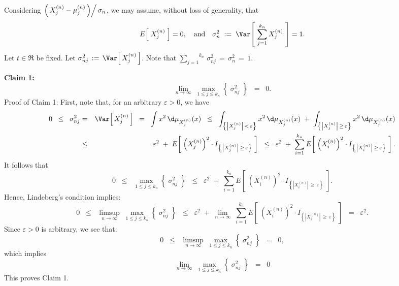 \proof
Considering $\left.\left(\,X^{(n)}_{j} - \mu^{(n)}_{j}\,\right) \right/ \sigma_{n}$, we may assume, without loss of generality, that
\begin{equation*}
E\!\left[\;X^{(n)}_{j}\;\right] = 0,
\quad\textnormal{and}\quad
\sigma^{2}_{n}\;:=\;\Var\!\left[\;\sum^{k_{n}}_{j=1}X^{(n)}_{j}\;\right] = 1.
\end{equation*}
Let $t \in \Re$ be fixed.
Let $\sigma^{2}_{nj} \,:=\, \Var\!\left[\,X^{(n)}_{j}\,\right]$.
Note that $\overset{k_{n}}{\underset{j=1}{\sum}}\,\sigma^{2}_{nj} \,=\, \sigma^{2}_{n} \,=\,1$.

\vskip 0.5cm
\noindent
\textbf{Claim 1:}
\begin{equation*}
\lim_{n\rightarrow\infty}\;\max_{1\leq j \leq k_{n}}\left\{\; \sigma^{2}_{nj} \;\right\}
\;\;=\;\; 0.
\end{equation*}
{\small Proof of Claim 1:
First, note that, for an arbitrary $\varepsilon > 0$, we have
\begin{eqnarray*}
0 \;\;\leq\;\;
\sigma^{2}_{nj}
&=& \Var\!\left[\,X^{(n)}_{j}\,\right]
\;\;=\;\; \int x^{2}\,\d\mu_{X^{(n)}_{j}}(x)
\;\;\leq\;\;  \int_{\left\{\left\vert X^{(n)}_{j}\right\vert\,<\,\varepsilon\right\}}x^{2}\,\d\mu_{X^{(n)}_{j}}(x)
\;+\;  \int_{\left\{\left\vert X^{(n)}_{j}\right\vert\,\geq\,\varepsilon\right\}}x^{2}\,\d\mu_{X^{(n)}_{j}}(x)
\\
&\leq& \varepsilon^{2}
\;+\; E\!\left[\;\left(X^{(n)}_{j}\right)^{2}\cdot I_{\left\{\left\vert X^{(n)}_{j}\right\vert\,\geq\,\varepsilon\right\}}\;\right]
\;\;\leq\;\; \varepsilon^{2}
\;+\; \sum_{i=1}^{k_{n}}E\!\left[\;\left(X^{(n)}_{i}\right)^{2}\cdot I_{\left\{\left\vert X^{(n)}_{i}\right\vert\,\geq\,\varepsilon\right\}}\;\right].
\end{eqnarray*}
It follows that
\begin{equation*}
0 \;\;\leq\;\;
\max_{1 \leq j \leq k_{n}}\left\{\;\sigma^{2}_{nj}\;\right\}
\;\;\leq\;\; \varepsilon^{2}
\;+\; \sum_{i=1}^{k_{n}}E\!\left[\;\left(X^{(n)}_{i}\right)^{2}\cdot I_{\left\{\left\vert X^{(n)}_{i}\right\vert\,\geq\,\varepsilon\right\}}\;\right].
\end{equation*}
Hence, Lindeberg's condition implies:
\begin{equation*}
0 \;\;\leq\;\;
\limsup_{n\rightarrow\infty}\;\max_{1 \leq j \leq k_{n}}\left\{\;\sigma^{2}_{nj}\;\right\}
\;\;\leq\;\; \varepsilon^{2}
\;+\; \lim_{n\rightarrow\infty}\;\sum_{i=1}^{k_{n}}E\!\left[\;\left(X^{(n)}_{i}\right)^{2}\cdot I_{\left\{\left\vert X^{(n)}_{i}\right\vert\,\geq\,\varepsilon\right\}}\;\right]
\;\;=\;\; \varepsilon^{2}.
\end{equation*}
Since $\varepsilon > 0$ is arbitrary, we see that:
\begin{equation*}
0 \;\;\leq\;\;
\limsup_{n\rightarrow\infty}\;\max_{1 \leq j \leq k_{n}}\left\{\;\sigma^{2}_{nj}\;\right\}
\;\;=\;\; 0,
\end{equation*}
which implies
\begin{equation*}
\lim_{n\rightarrow\infty}\;\max_{1 \leq j \leq k_{n}}\left\{\;\sigma^{2}_{nj}\;\right\}
\;\;=\;\; 0
\end{equation*}
This proves Claim 1.
}

